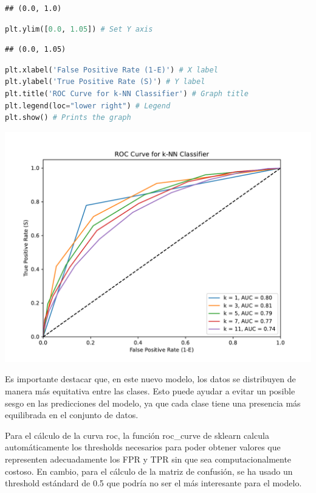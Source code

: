 \documentclass[
]{article}
\begin{document}
\begin{lstlisting}
## (0.0, 1.0)
\end{lstlisting}

\begin{lstlisting}[language=Python]
plt.ylim([0.0, 1.05]) # Set Y axis
\end{lstlisting}

\begin{lstlisting}
## (0.0, 1.05)
\end{lstlisting}

\begin{lstlisting}[language=Python]
plt.xlabel('False Positive Rate (1-E)') # X label
plt.ylabel('True Positive Rate (S)') # Y label
plt.title('ROC Curve for k-NN Classifier') # Graph title
plt.legend(loc="lower right") # Legend
plt.show() # Prints the graph
\end{lstlisting}

\includegraphics{code_files/figure-latex/unnamed-chunk-8-1.pdf}

Es importante destacar que, en este nuevo modelo, los datos se
distribuyen de manera más equitativa entre las clases. Esto puede ayudar
a evitar un posible sesgo en las predicciones del modelo, ya que cada
clase tiene una presencia más equilibrada en el conjunto de datos.

Para el cálculo de la curva roc, la función roc\_curve de sklearn
calcula automáticamente los thresholds necesarios para poder obtener
valores que representen adecuadamente los FPR y TPR sin que sea
computacionalmente costoso. En cambio, para el cálculo de la matriz de
confusión, se ha usado un threshold estándard de 0.5 que podría no ser
el más interesante para el modelo.
\end{document}
